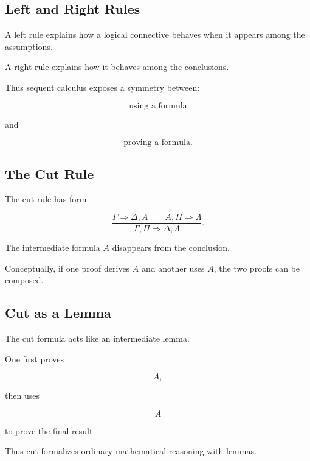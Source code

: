 \subsection{Left and Right Rules}
\label{subsec:left-right-sequent-rules}

A left rule explains how a logical connective behaves when it appears among
the assumptions.

A right rule explains how it behaves among the conclusions.

Thus sequent calculus exposes a symmetry between:

\[
\boxed{
\text{using a formula}
}
\]

and

\[
\boxed{
\text{proving a formula}.
}
\]

\subsection{The Cut Rule}
\label{subsec:cut-rule}

The cut rule has form

\[
\boxed{
\frac{
\Gamma\Rightarrow\Delta,A
\qquad
A,\Pi\Rightarrow\Lambda
}{
\Gamma,\Pi
\Rightarrow
\Delta,\Lambda
}.
}
\]

The intermediate formula \(A\) disappears from the conclusion.

Conceptually, if one proof derives \(A\) and another uses \(A\), the two
proofs can be composed.

\subsection{Cut as a Lemma}
\label{subsec:cut-as-lemma}

The cut formula acts like an intermediate lemma.

One first proves

\[
A,
\]

then uses

\[
A
\]

to prove the final result.

Thus cut formalizes ordinary mathematical reasoning with lemmas.

